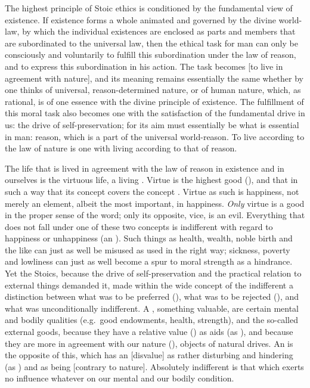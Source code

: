 The highest principle of Stoic ethics is conditioned by the fundamental
view of existence. If existence forms a whole animated and governed by
the divine world-law, by which the individual existences are enclosed as
parts and members that are subordinated to the universal law, then the
ethical task for man can only be consciously and voluntarily to fulfill
this subordination under the law of reason, and to express this
subordination in his action. The task becomes
 [to live in agreement with nature], and
its meaning remains essentially the same whether by  one thinks
of universal, reason-determined nature, or of human nature, which, as
rational, is of one essence with the divine principle of existence. The
fulfillment of this moral task also becomes one with the satisfaction of
the fundamental drive in us: the drive of self-preservation; for its aim
must essentially be what is essential in man: reason, which is a part of
the universal world-reason. To live according to the law of nature is
one with living according to that of reason.

The life that is lived in agreement with the law of reason in existence
and in ourselves is the virtuous life, a living . Virtue is the highest good (), and that in
such a way that its concept covers the concept . Virtue as
such is happiness, not merely an element, albeit the most important, in
happiness. \emph{Only} virtue is a good in the proper sense of the word;
only its opposite, vice, is an evil. Everything that does not fall under
one of these two concepts is indifferent with regard to happiness or
unhappiness (an ). Such things as health, wealth, noble
birth and the like can just as well be misused as used in the right way;
sickness, poverty and lowliness can just as well become a spur to moral
strength as a hindrance. Yet the Stoics, because the drive of
self-preservation and the practical relation to external
things demanded it, made within the wide concept of the indifferent a
distinction between what was to be preferred (), what
was to be rejected (), and what was unconditionally
indifferent. A , something valuable, are certain mental
and bodily qualities (e.g.\ good endowments, health, strength), and the
so-called external goods, because they have a relative value
() as aids (as ), and because they are more in
agreement with our nature (), objects of natural drives.
An  is the opposite of this, which has an
 [disvalue] as rather disturbing and hindering (as
) and as being  [contrary to nature].
Absolutely indifferent is that which exerts no influence whatever on our
mental and our bodily condition.

